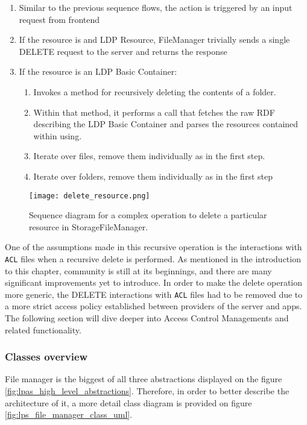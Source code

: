\begin{enumerate}
    \item Similar to the previous sequence flows, the action is triggered by an input request from \lpa{} frontend
    \item If the resource is and LDP Resource, FileManager trivially sends 
       a single DELETE request to the server and returns the response
    \item If the resource is an LDP Basic Container:
        \begin{enumerate}
        \item Invokes a method for recursively deleting the contents of a folder.
        \item Within that method, it performs a call that fetches the raw RDF describing the LDP Basic Container and parses the resources contained within using. 
        \item Iterate over files, remove them individually as in the first step.
        \item Iterate over folders, remove them individually as in the first step 
        \end{enumerate}
\end{enumerate}


\begin{figure}[h]
\centering
\texttt{[image: delete\_resource.png]}
\caption{Sequence diagram for a complex operation to delete a particular resource in StorageFileManager.}
\label{fig:lps_delete_resource}
\end{figure}


One of the assumptions made in this recursive operation is the interactions with \texttt{ACL} files when a recursive delete is performed. As mentioned in the introduction to this chapter, \solid{} community is still at its beginnings, and there are many significant improvements yet to introduce. In order to make the delete operation more generic, the DELETE interactions with \texttt{ACL} files had to be removed due to a more strict access policy established between providers of the server and \solid{} apps. The following section will dive deeper into Access Control Managements and related functionality.

\subsubsection{Classes overview}

File manager is the biggest of all three abstractions displayed on the figure \ref{fig:lpas_high_level_abstractions}. Therefore, in order to better describe the architecture of it, a more detail class diagram is provided on figure \ref{fig:lps_file_manager_class_uml}.

